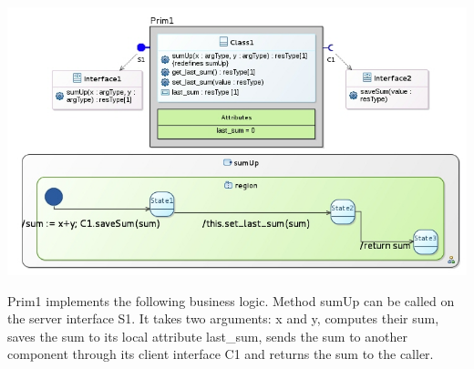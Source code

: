 \documentclass[12pt]{article}
\begin{document}
     \centerline{
     \includegraphics[width=14cm]{draws/example-full.jpg}
     \label{fig:example-full}
     }

Prim1 implements the following business logic. Method sumUp can be called on the server interface S1. It takes two arguments: x and y, computes their sum, saves the sum to its local attribute last\_sum, sends the sum to another component through its client interface C1 and returns the sum to the caller. 
\end{document}
